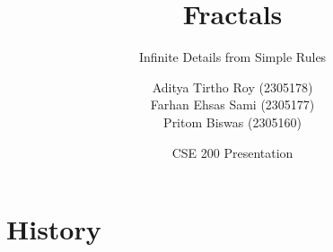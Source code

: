 

\title{Fractals}
\subtitle{Infinite Details from Simple Rules}
\author[Aditya, Sami, Pritom]{%
  Aditya Tirtho Roy (2305178)\\
  Farhan Ehsas Sami (2305177)\\
  Pritom Biswas (2305160)}
\date{CSE 200 Presentation}

\newcommand{\takeaway}[1]{%
  \begin{tcolorbox}[colback=PrimaryColor!8, colframe=PrimaryColor, arc=2mm,
    boxrule=0.8pt, left=6pt, right=6pt, top=3pt, bottom=3pt]
    \small #1
  \end{tcolorbox}}
\newcommand{\source}[1]{{\scriptsize\color{DarkGray}#1}}




\begin{frame}[plain]
  \titlepage
\end{frame}

\section{History}


